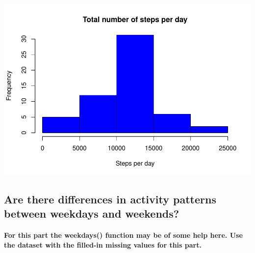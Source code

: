 \documentclass[]{article}
\newenvironment{Shaded}{\begin{snugshade}}{\end{snugshade}}
\newcommand{\KeywordTok}[1]{\textcolor[rgb]{0.13,0.29,0.53}{\textbf{#1}}}
\newcommand{\DataTypeTok}[1]{\textcolor[rgb]{0.13,0.29,0.53}{#1}}
\newcommand{\DecValTok}[1]{\textcolor[rgb]{0.00,0.00,0.81}{#1}}
\newcommand{\StringTok}[1]{\textcolor[rgb]{0.31,0.60,0.02}{#1}}
\newcommand{\OperatorTok}[1]{\textcolor[rgb]{0.81,0.36,0.00}{\textbf{#1}}}
\newcommand{\NormalTok}[1]{#1}
\let\oldparagraph\paragraph
\renewcommand{\paragraph}[1]{\oldparagraph{#1}\mbox{}}
\begin{document}
\begin{Shaded}
\end{Shaded}

\includegraphics{PA1_template_files/figure-latex/unnamed-chunk-12-1.pdf}

\subsection{Are there differences in activity patterns between weekdays
and
weekends?}\label{are-there-differences-in-activity-patterns-between-weekdays-and-weekends}

\paragraph{For this part the weekdays() function may be of some help
here. Use the dataset with the filled-in missing values for this
part.}\label{for-this-part-the-weekdays-function-may-be-of-some-help-here.-use-the-dataset-with-the-filled-in-missing-values-for-this-part.}
\end{document}
